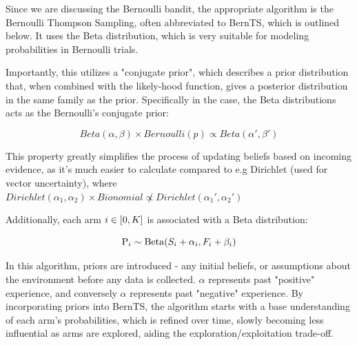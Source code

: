 Since we are discussing the Bernoulli bandit, the appropriate algorithm is the Bernoulli Thompson Sampling, often abbreviated to BernTS, which is outlined below. It uses the Beta distribution, which is very suitable for modeling probabilities in Bernoulli trials.

Importantly, this utilizes a "conjugate prior", which describes a prior distribution that, when combined with the likely-hood function, gives a posterior distribution in the same family as the prior. Specifically in the case, the Beta distributions acts as the Bernoulli's conjugate prior:

$$Beta(\alpha,\beta) \times Bernoulli(p) \propto Beta(\alpha',\beta')$$

This property greatly simplifies the process of updating beliefs based on incoming evidence, as it's much easier to calculate compared to e.g Dirichlet (used for vector uncertainty), where $Dirichlet(\alpha_1,\alpha_2) \times Bionomial \not\propto Dirichlet(\alpha_1',\alpha_2')$

Additionally, each arm $i \in [0, K]$ is associated with a Beta distribution:

$$\mathrm{P}_{i} \sim \mathrm{Beta}(S_i + \alpha_i, F_i + \beta_i)$$

In this algorithm, priors are introduced - any initial beliefs, or assumptions about the environment before any data is collected. $\alpha$ represents past "positive" experience, and conversely $\alpha$ represents past "negative" experience. By incorporating priors into BernTS, the algorithm starts with a base understanding of each arm's probabilities, which is refined over time, slowly becoming less influential as arms are explored, aiding the exploration/exploitation trade-off.



